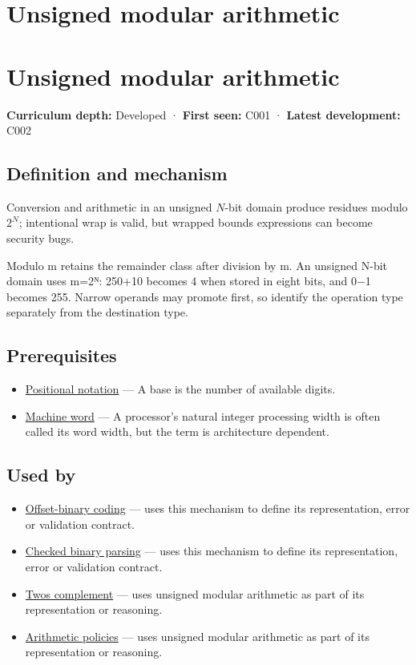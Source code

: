 \hypertarget{appendix-c99977d88b33}{}
\section*{Unsigned modular arithmetic}
\section{Unsigned modular arithmetic}\label{unsigned-modular-arithmetic}

\textbf{Curriculum depth:} Developed · \textbf{First seen:} C001 · \textbf{Latest development:} C002

\subsection{Definition and mechanism}\label{definition-and-mechanism}

Conversion and arithmetic in an unsigned \(N\)-bit domain produce residues modulo \(2^N\); intentional wrap is valid, but wrapped bounds expressions can become security bugs.

Modulo m retains the remainder class after division by m. An unsigned N-bit domain uses m=2ᴺ: 250+10 becomes 4 when stored in eight bits, and 0−1 becomes 255. Narrow operands may promote first, so identify the operation type separately from the destination type.

\subsection{Prerequisites}\label{prerequisites}

\begin{itemize}
\tightlist
\item
  \hyperref[appendix-83c3f28f7bda]{Positional notation} --- A base is the number of available digits.
\item
  \hyperref[appendix-d67a19507dc5]{Machine word} --- A processor's natural integer processing width is often called its word width, but the term is architecture dependent.
\end{itemize}

\subsection{Used by}\label{used-by}

\begin{itemize}
\item
  \hyperref[appendix-53a8cfb25f8d]{Offset-binary coding} --- uses this mechanism to define its representation, error or validation contract.
\item
  \hyperref[appendix-652d81568de9]{Checked binary parsing} --- uses this mechanism to define its representation, error or validation contract.
\item
  \hyperref[appendix-4fbc03d20829]{Two\textquotesingle s complement} --- uses unsigned modular arithmetic as part of its representation or reasoning.
\item
  \hyperref[appendix-2ed044358b82]{Arithmetic policies} --- uses unsigned modular arithmetic as part of its representation or reasoning.
\end{itemize}

